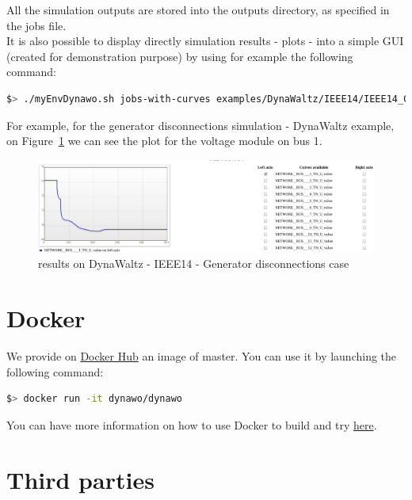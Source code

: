 \documentclass[a4paper, 12pt]{report}
\begin{document}
All the simulation outputs are stored into the outputs directory, as specified in the jobs file. \\

It is also possible to display directly simulation results - plots - into a simple GUI (created for demonstration purpose) by using for example the following command:

\begin{lstlisting}[language=bash, breaklines=true, breakatwhitespace=false]
$> ./myEnvDynawo.sh jobs-with-curves examples/DynaWaltz/IEEE14/IEEE14_GeneratorDisconnections/IEEE14.jobs
\end{lstlisting}

For example, for the generator disconnections simulation - DynaWaltz example, on Figure~\ref{IEEE14GeneratorDisconnections} we can see the plot for the voltage module on bus 1.

\begin{figure}[h!]
\centering
\includegraphics[width=\textwidth]{../resources/VoltageModule.png}
\caption{\Dynawo results on DynaWaltz - IEEE14 - Generator disconnections case}
\label{IEEE14GeneratorDisconnections}
\end{figure}

\section{\Dynawo Docker}

We provide on \href{https://hub.docker.com/r/dynawo/dynawo}{Docker Hub} an image of \Dynawo master. You can use it by launching the following command:

\begin{lstlisting}[language=bash]
$> docker run -it dynawo/dynawo
\end{lstlisting}

You can have more information on how to use Docker to build and try \Dynawo \href{https://github.com/dynawo/dynawo-docker}{here}.

\section{Third parties}
\end{document}
